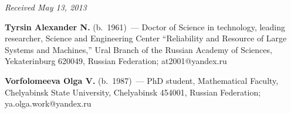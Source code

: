 \hfill{\small \textit{Received May 13, 2013}}


\Contr

\noindent
\textbf{Tyrsin Alexander N.} (b.\ 1961)~--- Doctor of Science in technology, leading 
researcher, Science and Engineering Center ``Reliability and Resource of Large 
Systems and Machines,'' Ural Branch of the Russian Academy of Sciences, 
Yekaterinburg 620049, Russian Federation; at2001@yandex.ru

\vspace*{3pt}
 \label{end\stat}

\noindent
\textbf{Vorfolomeeva Olga V.} (b.\ 1987)~--- PhD student, Mathematical Faculty, Chelyabinsk 
State University, Chelyabinsk 454001, Russian Federation; ya.olga.work@yandex.ru

\renewcommand{\bibname}{\protect\rm Литература}
   